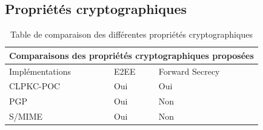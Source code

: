 \subsection{Propriétés cryptographiques}
\begin{table}[h!]
	\centering
	\begin{tabular}{ |p{3cm}||p{3cm}|p{3cm}| }
		\hline
		\multicolumn{3}{|c|}{Comparaisons des propriétés cryptographiques proposées} \\
		\hline
		Implémentations & E2EE & Forward Secrecy\\
		\hline
		CLPKC-POC   & Oui & Oui\\
		PGP & Oui & Non\\
		S/MIME & Oui & Non\\
		\hline
	\end{tabular}
	\caption{Table de comparaison des différentes propriétés cryptographiques }
	\label{table:comparisonProperties}
\end{table}
